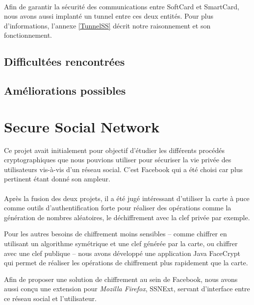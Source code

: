 \documentclass[a4paper,11pt,french]{article}
\begin{document}
\paragraph{}
Afin de garantir la sécurité des communications entre SoftCard et SmartCard,
nous avons aussi implanté un tunnel entre ces deux entités. Pour plus 
d'informations, l'annexe \ref{TunnelSS} décrit notre raisonnement et son
fonctionnement.

\subsection{Difficultées rencontrées}

\subsection{Améliorations possibles}

\clearpage

\section{Secure Social Network}
Ce projet avait initialement pour objectif d'étudier les différents 
procédés cryptographiques que nous pouvions utiliser pour sécuriser la vie
privée des utilisateurs vis-à-vis d'un réseau social. C'est Facebook qui a 
été choisi car plus pertinent étant donné son ampleur. 

\paragraph{}
Après la fusion des deux projets, il a été jugé intéressant d'utiliser 
la carte à puce comme outils d'authentification forte pour réaliser des 
opérations comme la génération de nombres aléatoires, le déchiffrement 
avec la clef privée par exemple.

Pour les autres besoins de chiffrement moins sensibles -- comme chiffrer
en utilisant un algorithme symétrique et une clef générée par la carte, ou
chiffrer avec une clef publique -- nous avons développé une application
Java \og{}FaceCrypt \fg{} qui permet de réaliser les opérations de chiffrement
plus rapidement que la carte.

Afin de proposer une solution de chiffrement au sein de Facebook, nous avons 
aussi conçu une extension pour \emph{Mozilla Firefox}, SSNExt, servant 
d'interface entre ce réseau social et l'utilisateur.
\end{document}

